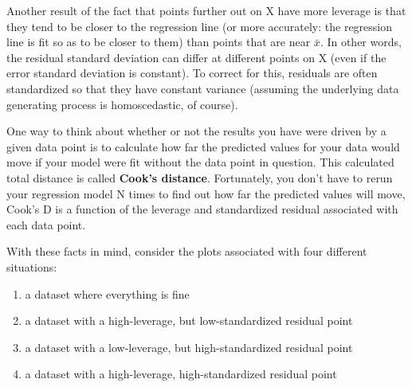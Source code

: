 \documentclass[main.tex]{subfiles}
\begin{document}
Another result of the fact that points further out on X have more leverage is that they tend to be closer to the regression line (or more accurately: the regression line is fit so as to be closer to them) than points that are near $\bar{x}$. In other words, the residual standard deviation can differ at different points on X (even if the error standard deviation is constant). To correct for this, residuals are often standardized so that they have constant variance (assuming the underlying data generating process is homoscedastic, of course).

One way to think about whether or not the results you have were driven by a given data point is to calculate how far the predicted values for your data would move if your model were fit without the data point in question. This calculated total distance is called \textbf{Cook's distance}. Fortunately, you don't have to rerun your regression model N times to find out how far the predicted values will move, Cook's D is a function of the leverage and standardized residual associated with each data point.

With these facts in mind, consider the plots associated with four different situations:
\begin{enumerate}
\item a dataset where everything is fine
\item a dataset with a high-leverage, but low-standardized residual point
\item a dataset with a low-leverage, but high-standardized residual point
\item a dataset with a high-leverage, high-standardized residual point
\end{enumerate}
\newpage
\end{document}
